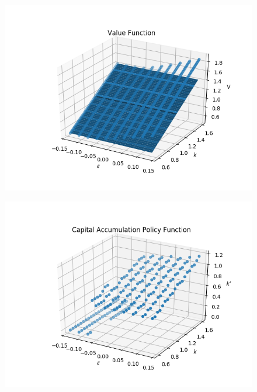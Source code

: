 \documentclass[]{article}
\begin{document}
\begin{figure}[H]
	\centering
	\includegraphics[scale=0.5]{Figures/VF-5}
	\label{figure:1}
\end{figure}

\begin{figure}[H]
	\centering
	\includegraphics[scale=0.5]{Figures/Vf-6}
	\label{figure:1}
\end{figure}
\end{document}
